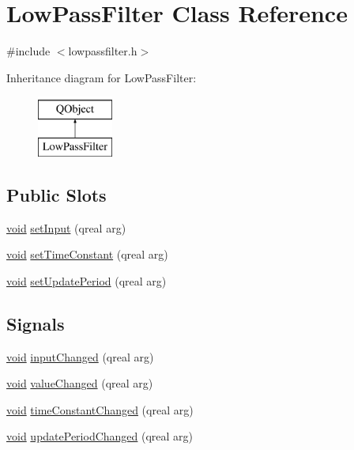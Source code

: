 \hypertarget{class_low_pass_filter}{\section{Low\-Pass\-Filter Class Reference}
\label{class_low_pass_filter}
}


{\ttfamily \#include $<$lowpassfilter.\-h$>$}

Inheritance diagram for Low\-Pass\-Filter\-:\begin{figure}[H]
\begin{center}
\leavevmode
\includegraphics[height=2.000000cm]{class_low_pass_filter}
\end{center}
\end{figure}
\subsection*{Public Slots}
\begin{DoxyCompactItemize}
\item 
\hyperlink{group___u_a_v_objects_plugin_ga444cf2ff3f0ecbe028adce838d373f5c}{void} \hyperlink{class_low_pass_filter_a8ffe4e89963aeeb9cbc3d7ff9ea7bf65}{set\-Input} (qreal arg)
\item 
\hyperlink{group___u_a_v_objects_plugin_ga444cf2ff3f0ecbe028adce838d373f5c}{void} \hyperlink{class_low_pass_filter_afbffbe1e5869efaa7e6af73cfdd73757}{set\-Time\-Constant} (qreal arg)
\item 
\hyperlink{group___u_a_v_objects_plugin_ga444cf2ff3f0ecbe028adce838d373f5c}{void} \hyperlink{class_low_pass_filter_a835f0c970fa58a7b456259b7871f3455}{set\-Update\-Period} (qreal arg)
\end{DoxyCompactItemize}
\subsection*{Signals}
\begin{DoxyCompactItemize}
\item 
\hyperlink{group___u_a_v_objects_plugin_ga444cf2ff3f0ecbe028adce838d373f5c}{void} \hyperlink{class_low_pass_filter_a2293d8b7286bf10aa2b01272be435fab}{input\-Changed} (qreal arg)
\item 
\hyperlink{group___u_a_v_objects_plugin_ga444cf2ff3f0ecbe028adce838d373f5c}{void} \hyperlink{class_low_pass_filter_a0cf9a9e7e11e71b2d69a166dca569e7b}{value\-Changed} (qreal arg)
\item 
\hyperlink{group___u_a_v_objects_plugin_ga444cf2ff3f0ecbe028adce838d373f5c}{void} \hyperlink{class_low_pass_filter_a2df94ddd52514427afeeaa55233d2ca9}{time\-Constant\-Changed} (qreal arg)
\item 
\hyperlink{group___u_a_v_objects_plugin_ga444cf2ff3f0ecbe028adce838d373f5c}{void} \hyperlink{class_low_pass_filter_a8ada11275d48621aeb4fc2d9bb09a6a3}{update\-Period\-Changed} (qreal arg)
\end{DoxyCompactItemize}
